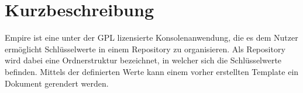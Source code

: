 
\section{Kurzbeschreibung}

Empire ist eine unter der GPL lizensierte Konsolenanwendung, die es dem Nutzer ermöglicht Schlüsselwerte in einem Repository zu organisieren. Als Repository wird dabei eine Ordnerstruktur bezeichnet, in welcher sich die Schlüsselwerte befinden.
Mittels der definierten Werte kann einem vorher erstellten Template ein Dokument gerendert werden.
